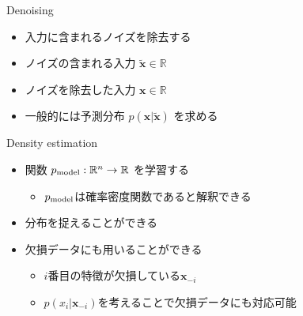 \documentclass[dvipdfmx, 10pt]{beamer}
\newcommand{\green}[1]{\textcolor{green!40!black}{#1}}
\begin{document}

\begin{frame}{Denoising}
  \begin{itemize}
    \item 入力に含まれるノイズを除去する
    \item ノイズの含まれる入力 $\tilde{\bm{x}} \in \mathbb{R}$
    \item ノイズを除去した入力 $\bm{x} \in \mathbb{R}$
    \item 一般的には予測分布 $p(\bm{x}|\tilde{\bm{x}})$ を求める
  \end{itemize}
\end{frame}


\begin{frame}{Density estimation}
  \begin{itemize}
    \item 関数 $p_{\rm model} : \mathbb{R} ^ {n} \to \mathbb{R}$ を学習する
    \begin{itemize}
      \item $p_{\rm model}$は確率密度関数であると解釈できる
    \end{itemize}
    \item 分布を捉えることができる
    \item 欠損データにも用いることができる
    \begin{itemize}
      \item $i$番目の特徴が欠損している$\bm{x}_{-i}$
      \item $p(x_{i}|\bm{x}_{-i})$を考えることで欠損データにも対応可能
    \end{itemize}
  \end{itemize}
\end{frame}

\end{document}
